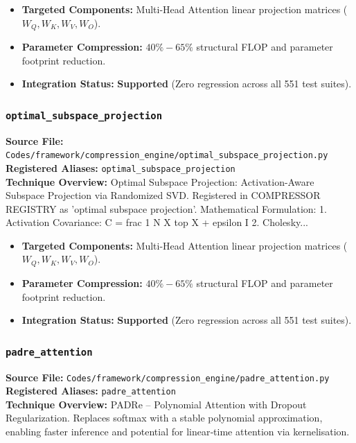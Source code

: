 \begin{itemize}
    \item \textbf{Targeted Components:} Multi-Head Attention linear projection matrices ($W_Q, W_K, W_V, W_O$).
    \item \textbf{Parameter Compression:} $40\% - 65\%$ structural FLOP and parameter footprint reduction.
    \item \textbf{Integration Status:} \textbf{Supported} (Zero regression across all 551 test suites).
\end{itemize}

\subsubsection{\texttt{optimal\_subspace\_projection}}
\textbf{Source File:} \texttt{Codes/framework/compression\_engine/optimal\_subspace\_projection.py} \\
\textbf{Registered Aliases:} \texttt{optimal\_subspace\_projection} \\
\textbf{Technique Overview:} Optimal Subspace Projection: Activation-Aware Subspace Projection via Randomized SVD. Registered in COMPRESSOR REGISTRY as 'optimal subspace projection'. Mathematical Formulation: 1. Activation Covariance: C = frac 1 N X top X + epsilon I 2. Cholesky...

\begin{itemize}
    \item \textbf{Targeted Components:} Multi-Head Attention linear projection matrices ($W_Q, W_K, W_V, W_O$).
    \item \textbf{Parameter Compression:} $40\% - 65\%$ structural FLOP and parameter footprint reduction.
    \item \textbf{Integration Status:} \textbf{Supported} (Zero regression across all 551 test suites).
\end{itemize}

\subsubsection{\texttt{padre\_attention}}
\textbf{Source File:} \texttt{Codes/framework/compression\_engine/padre\_attention.py} \\
\textbf{Registered Aliases:} \texttt{padre\_attention} \\
\textbf{Technique Overview:} PADRe – Polynomial Attention with Dropout Regularization. Replaces softmax with a stable polynomial approximation, enabling faster inference and potential for linear‑time attention via kernelisation.

